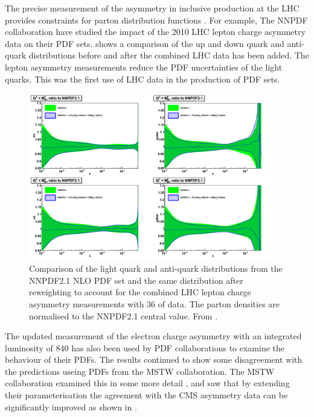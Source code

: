 The precise measurement of the asymmetry in inclusive \PW production at the LHC
provides constraints for parton distribution functions \cite{asym840}.  For
example, The NNPDF collaboration \cite{Lionetti:2011pw} have studied the impact
of the 2010 LHC \PW lepton charge asymmetry data on their PDF sets\cite{Ball:2011gg}.
 shows a comparison of the up and down quark and
anti-quark distributions before and after the combined LHC data has been
added\cite{Ball:2011gg}.  The lepton asymmetry measurements reduce the PDF
uncertainties of the light quarks. This was the first use of LHC data in
the production of PDF sets. 

\begin{figure}[htbp]
  \begin{center}
  \includegraphics*[width=0.95\textwidth]{nnpdf_better}
  \caption[Comparison of the light quark and anti-quark distributions from the
NNPDF2.1 NLO PDF set and the same distribution after reweighting to account for
the LHC lepton charge asymmetry measurements with \unit{36}{\invpb} of data.]
{Comparison of the light quark and anti-quark distributions from the NNPDF2.1
NLO PDF set and the same distribution after reweighting to account for the
combined LHC lepton charge asymmetry measurements with \unit{36}{\invpb} of
data.  The parton densities are normalised to the NNPDF2.1 central value.  From
\cite{Ball:2011gg}. } \label{fig:effect}
  \end{center}
\end{figure}

The updated measurement of the electron charge asymmetry with an integrated
luminosity of \unit{840}{\invpb} has also been used by PDF collaborations to
examine the behaviour of their PDFs.
The results continued to show some disagreement with the predictions useing PDFs
from the MSTW collaboration.  The MSTW collaboration examined this in some more
detail \cite{martin2013extended}, and saw that by extending their
parameterisation the agreement with the CMS asymmetry data can be significantly
improved as shown in .

